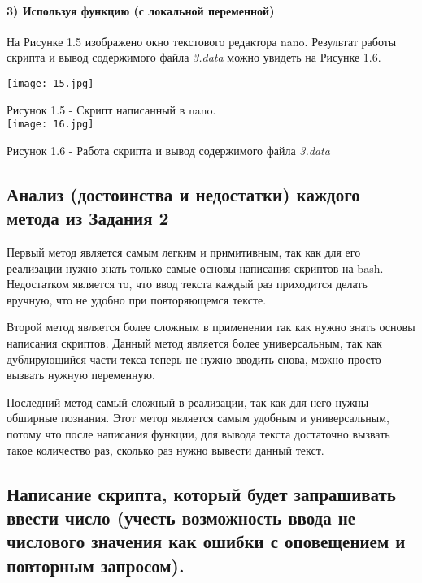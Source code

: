 \paragraph{3) Используя функцию (с локальной переменной)
\\}

На Рисунке 1.5 изображено окно текстового редактора nano. Результат работы скрипта и вывод содержимого файла \textit{3.data} можно увидеть на Рисунке 1.6.

\vspace{0.5cm}
		\begin{center}
			\texttt{[image: 15.jpg]}

			Рисунок 1.5 - Скрипт написанный в nano.\\

			\texttt{[image: 16.jpg]}

			Рисунок 1.6 - Работа скрипта и вывод содержимого файла \textit{3.data}\\

		\end{center}



\subsection*{Анализ (достоинства и недостатки) каждого метода из Задания 2
\\}

Первый метод является самым легким и примитивным, так как для его реализации нужно знать только самые основы написания скриптов на bash. Недостатком является то, что ввод текста каждый раз приходится делать вручную, что не удобно при повторяющемся тексте.

Второй метод является более сложным в применении так как нужно знать основы написания скриптов. Данный метод является более универсальным, так как дублирующийся части текса теперь не нужно вводить снова, можно просто вызвать нужную переменную.

Последний метод самый сложный в реализации, так как для него нужны обширные познания. Этот метод является самым удобным и универсальным, потому что после написания функции, для вывода текста достаточно вызвать такое количество раз, сколько раз нужно вывести данный текст.\\



\subsection*{Написание скрипта, который будет запрашивать ввести число (учесть возможность ввода не числового значения как ошибки с оповещением и повторным запросом).
\\}

